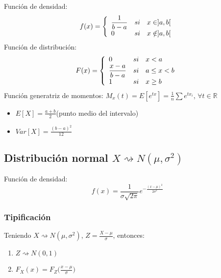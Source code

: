 \documentclass[11pt,twoside,titlepage,a4paper]{article}
\theoremstyle{definition}
\theoremstyle{plain_rojo}
\theoremstyle{remark}
\begin{document}
Función de densidad:
\begin{equation*}
f(x)=\left\{
	\begin{array}{l c l}
	\displaystyle\frac{1}{b-a} & si & x\in]a,b[\\
	0 & si & x\notin]a,b[
	\end{array}
\right.
\end{equation*}
Función de distribución:
\begin{equation*}
F(x)=\left\{
	\begin{array}{l c l}
	0 & si & x<a \\
	\displaystyle\frac{x-a}{b-a} & si & a\leq x<b \\
	1 & si & x\geq b
	\end{array}
\right.
\end{equation*}
Función generatriz de momentos: $M_x(t)=E[e^{tx}]=\frac 1n\sum e^{tx_i}$, $\forall t\in\mathbb{R}$
\begin{multicols}{2}
	\begin{itemize}[label={}]
		\item $E[X]=\displaystyle\frac{a+b}{2}$\quad(punto medio del intervalo)
		\item $Var[X]=\displaystyle\frac{(b-a)^2}{12}$
	\end{itemize}
\end{multicols}

\subsection{Distribución normal $X\rightsquigarrow N(\mu,\sigma^2)$}

Función de densidad:
$$f(x)=\frac{1}{\sigma\sqrt{2\pi}}e^{-\displaystyle\frac{(x-\mu)^2}{2\sigma^2}}$$

\subsubsection{Tipificación}

Teniendo $X\rightsquigarrow N(\mu,\sigma^2)$, $Z=\displaystyle\frac{X-\mu}{\sigma}$, entonces:
\begin{enumerate}[font={\color{rojooscuro}\bfseries}]
	\item $Z\rightsquigarrow N(0,1)$
	\item $F_X(x)=F_Z\Big(\displaystyle\frac{x-\mu}{\sigma}\Big)$
\end{enumerate}
\end{document}
